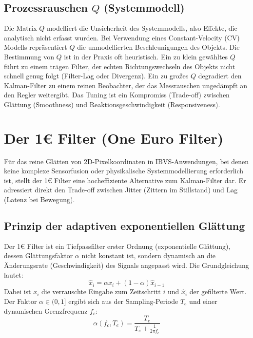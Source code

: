 \documentclass{article}
\begin{document}
\subsection{Prozessrauschen $Q$ (Systemmodell)}
Die Matrix $Q$ modelliert die Unsicherheit des Systemmodells, also Effekte, die analytisch nicht erfasst wurden. Bei Verwendung eines Constant-Velocity (CV) Modells repräsentiert $Q$ die unmodellierten Beschleunigungen des Objekts.
Die Bestimmung von $Q$ ist in der Praxis oft heuristisch. Ein zu klein gewähltes $Q$ führt zu einem trägen Filter, der echten Richtungswechseln des Objekts nicht schnell genug folgt (Filter-Lag oder Divergenz). Ein zu großes $Q$ degradiert den Kalman-Filter zu einem reinen Beobachter, der das Messrauschen ungedämpft an den Regler weitergibt. Das Tuning ist ein Kompromiss (Trade-off) zwischen Glättung (Smoothness) und Reaktionsgeschwindigkeit (Responsiveness).





\section{Der 1\euro{} Filter (One Euro Filter)}
\label{sec:one_euro_filter}

Für das reine Glätten von 2D-Pixelkoordinaten in IBVS-Anwendungen, bei denen keine komplexe Sensorfusion oder physikalische Systemmodellierung erforderlich ist, stellt der 1\euro{} Filter eine hocheffiziente Alternative zum Kalman-Filter dar. Er adressiert direkt den Trade-off zwischen Jitter (Zittern im Stillstand) und Lag (Latenz bei Bewegung).




\subsection{Prinzip der adaptiven exponentiellen Glättung}
Der 1\euro{} Filter ist ein Tiefpassfilter erster Ordnung (exponentielle Glättung), dessen Glättungsfaktor $\alpha$ nicht konstant ist, sondern dynamisch an die Änderungsrate (Geschwindigkeit) des Signals angepasst wird. Die Grundgleichung lautet:
\begin{equation}
    \hat{x}_i = \alpha x_i + (1 - \alpha) \hat{x}_{i-1}
\end{equation}
Dabei ist $x_i$ die verrauschte Eingabe zum Zeitschritt $i$ und $\hat{x}_i$ der gefilterte Wert. Der Faktor $\alpha \in (0, 1]$ ergibt sich aus der Sampling-Periode $T_e$ und einer dynamischen Grenzfrequenz $f_c$:
\begin{equation}
    \alpha(f_c, T_e) = \frac{T_e}{T_e + \frac{1}{2 \pi f_c}}
\end{equation}
\end{document}
